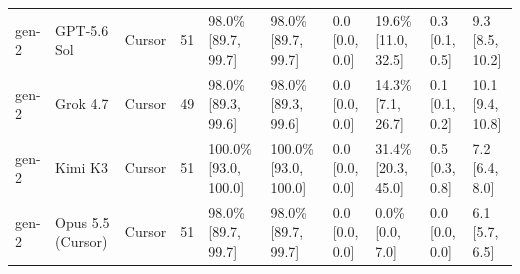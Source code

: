 \begin{tabular}{llllllllll}
gen-2 & GPT-5.6 Sol & Cursor & 51 & 98.0\% [89.7, 99.7] & 98.0\% [89.7, 99.7] & 0.0 [0.0, 0.0] & 19.6\% [11.0, 32.5] & 0.3 [0.1, 0.5] & 9.3 [8.5, 10.2] \\
gen-2 & Grok 4.7 & Cursor & 49 & 98.0\% [89.3, 99.6] & 98.0\% [89.3, 99.6] & 0.0 [0.0, 0.0] & 14.3\% [7.1, 26.7] & 0.1 [0.1, 0.2] & 10.1 [9.4, 10.8] \\
gen-2 & Kimi K3 & Cursor & 51 & 100.0\% [93.0, 100.0] & 100.0\% [93.0, 100.0] & 0.0 [0.0, 0.0] & 31.4\% [20.3, 45.0] & 0.5 [0.3, 0.8] & 7.2 [6.4, 8.0] \\
gen-2 & Opus 5.5 (Cursor) & Cursor & 51 & 98.0\% [89.7, 99.7] & 98.0\% [89.7, 99.7] & 0.0 [0.0, 0.0] & 0.0\% [0.0, 7.0] & 0.0 [0.0, 0.0] & 6.1 [5.7, 6.5] \\
\bottomrule
\end{tabular}
